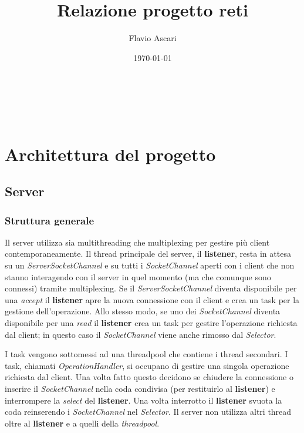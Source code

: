 \documentclass[a4paper]{article}
\title{Relazione progetto reti}\let\Title\@title
\author{Flavio Ascari}\let\Author\@author
\date{\today}\let\Date\@date
\theoremstyle{theorem}
\theoremstyle{remark}
\theoremstyle{definition}
\theoremstyle{corollary}
\theoremstyle{lemma}
\begin{document}
\begin{center}
	\vspace*{0,5 cm}
	{\Huge \textsc{\Title}} \\
	\vspace{0,5 cm}
	\textsc{\Author} \
	\textsc{\Date}
	\thispagestyle{empty}
	\vspace{0,7 cm}
\end{center}
\small

\tableofcontents
\clearpage


\section{Architettura del progetto}
\subsection{Server}
\subsubsection{Struttura generale}
Il server utilizza sia multithreading che multiplexing per gestire più client contemporaneamente. Il thread principale del server, il \textbf{listener}, resta in attesa su un \textit{ServerSocketChannel} e su tutti i \textit{SocketChannel} aperti con i client che non stanno interagendo con il server in quel momento (ma che comunque sono connessi) tramite multiplexing. Se il \textit{ServerSocketChannel} diventa disponibile per una \textit{accept} il \textbf{listener} apre la nuova connessione con il client e crea un task per la gestione dell'operazione. Allo stesso modo, se uno dei \textit{SocketChannel} diventa disponibile per una \textit{read} il \textbf{listener} crea un task per gestire l'operazione richiesta dal client; in questo caso il \textit{SocketChannel} viene anche rimosso dal \textit{Selector}.

I task vengono sottomessi ad una threadpool che contiene i thread secondari. I task, chiamati \textit{OperationHandler}, si occupano di gestire una singola operazione richiesta dal client. Una volta fatto questo decidono se chiudere la connessione o inserire il \textit{SocketChannel} nella coda condivisa (per restituirlo al \textbf{listener}) e interrompere la \textit{select} del \textbf{listener}. Una volta interrotto il \textbf{listener} svuota la coda reinserendo i \textit{SocketChannel} nel \textit{Selector}. Il server non utilizza altri thread oltre al \textbf{listener} e a quelli della \textit{threadpool}.
\end{document}
